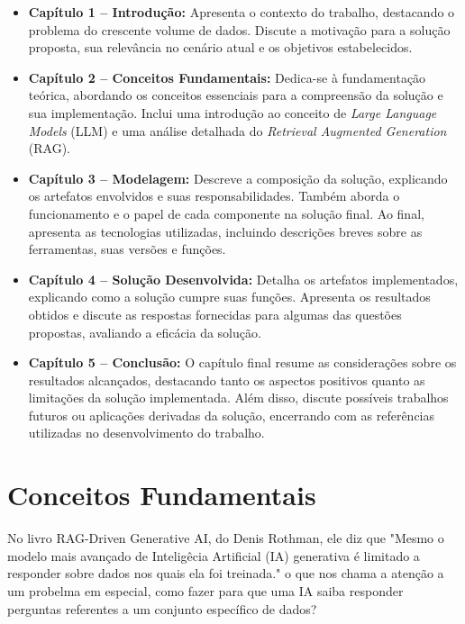 \documentclass[a4paper, 12pt]{article}
\begin{document}
    \begin{itemize}
        \item \textbf{Capítulo 1 -- Introdução:} Apresenta o contexto do trabalho, destacando o problema do crescente volume de dados. Discute a motivação para a solução proposta, sua relevância no cenário atual e os objetivos estabelecidos.
        \item \textbf{Capítulo 2 -- Conceitos Fundamentais:} Dedica-se à fundamentação teórica, abordando os conceitos essenciais para a compreensão da solução e sua implementação. Inclui uma introdução ao conceito de \textit{Large Language Models} (LLM) e uma análise detalhada do \textit{Retrieval Augmented Generation} (RAG).
        \item \textbf{Capítulo 3 -- Modelagem:} Descreve a composição da solução, explicando os artefatos envolvidos e suas responsabilidades. Também aborda o funcionamento e o papel de cada componente na solução final. Ao final, apresenta as tecnologias utilizadas, incluindo descrições breves sobre as ferramentas, suas versões e funções.
        \item \textbf{Capítulo 4 -- Solução Desenvolvida:} Detalha os artefatos implementados, explicando como a solução cumpre suas funções. Apresenta os resultados obtidos e discute as respostas fornecidas para algumas das questões propostas, avaliando a eficácia da solução.
        \item \textbf{Capítulo 5 -- Conclusão:} O capítulo final resume as considerações sobre os resultados alcançados, destacando tanto os aspectos positivos quanto as limitações da solução implementada. Além disso, discute possíveis trabalhos futuros ou aplicações derivadas da solução, encerrando com as referências utilizadas no desenvolvimento do trabalho.
    \end{itemize}
    
    \clearpage

    \section{Conceitos Fundamentais}

    No livro RAG-Driven Generative AI, do Denis Rothman, ele diz que "Mesmo o modelo mais avançado de Inteligêcia Artificial (IA) generativa é limitado a responder sobre dados nos quais ela foi treinada." \textcite{rothman} o que nos chama a atenção a um probelma em especial, como fazer para que uma IA saiba responder perguntas referentes a um conjunto específico de dados?
\end{document}
